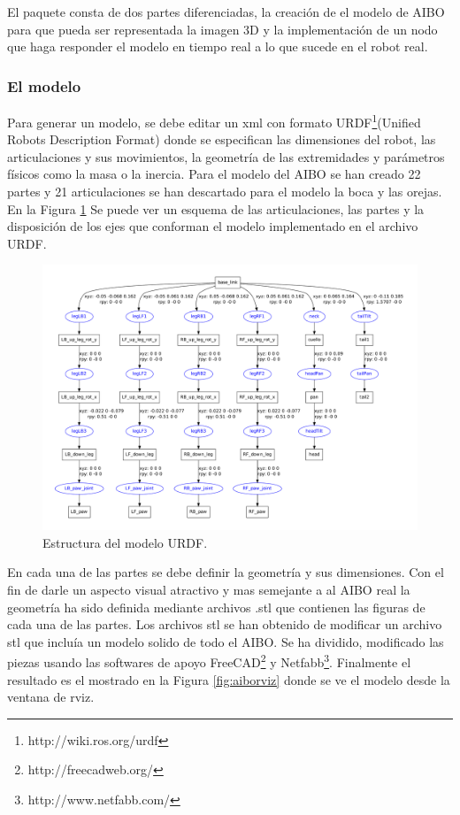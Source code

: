 \documentclass[12pt,a4paper,final,twoside]{book}
\begin{document}
El paquete consta de dos partes diferenciadas, la creación de el modelo de AIBO para que pueda ser representada la imagen 3D y la implementación de un nodo que haga responder el modelo en tiempo real a lo que sucede en el robot real.

\subsubsection{El modelo}
Para generar un modelo, se debe editar un xml con formato URDF\footnote{http://wiki.ros.org/urdf}(Unified Robots Description Format) donde se especifican las dimensiones del robot, las articulaciones y sus movimientos, la geometría de las extremidades y parámetros físicos como la masa o la inercia.
Para el modelo del AIBO se han creado 22 partes y 21 articulaciones se han descartado para el modelo la boca y las orejas. En la Figura \ref{fig:aibourdf} Se puede ver un esquema de las articulaciones, las partes y la disposición de los ejes que conforman el modelo implementado en el archivo URDF.

\newpage
\begin{figure}[H]
	\centering
    \includegraphics[scale=0.39]{images/Aibo.pdf}
	 \caption{Estructura del modelo URDF.}
  \label{fig:aibourdf}
\end{figure}

En  cada una de las partes se debe definir la geometría y sus dimensiones. Con el fin de darle un aspecto visual atractivo y mas semejante a al AIBO real la geometría ha sido  definida mediante archivos .stl que contienen las figuras de cada una de las partes. Los archivos stl se han obtenido de modificar un archivo stl que incluía un modelo solido de todo el AIBO. Se ha dividido, modificado las piezas usando las softwares de apoyo FreeCAD\footnote{http://freecadweb.org/} y Netfabb\footnote{http://www.netfabb.com/}. Finalmente el resultado es el mostrado en la Figura \ref{fig:aiborviz} donde se ve el modelo desde la ventana de rviz.
 
\end{document}

